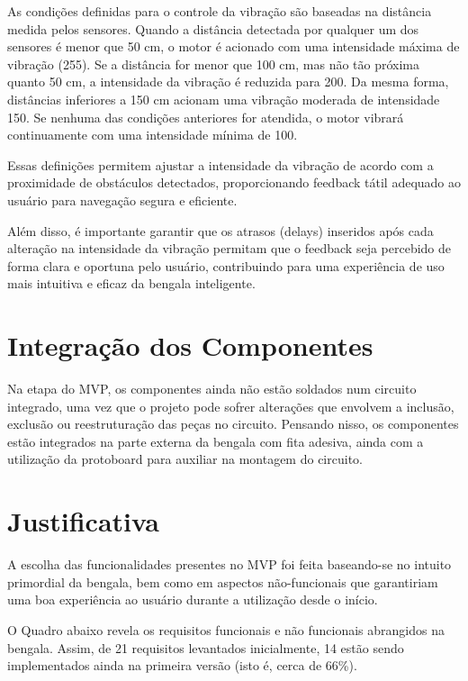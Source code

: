 As condições definidas para o controle da vibração são baseadas na distância medida pelos sensores. Quando a distância detectada por qualquer um dos sensores é menor que 50 cm, o motor é acionado com uma intensidade máxima de vibração (255). Se a distância for menor que 100 cm, mas não tão próxima quanto 50 cm, a intensidade da vibração é reduzida para 200. Da mesma forma, distâncias inferiores a 150 cm acionam uma vibração moderada de intensidade 150. Se nenhuma das condições anteriores for atendida, o motor vibrará continuamente com uma intensidade mínima de 100.

Essas definições permitem ajustar a intensidade da vibração de acordo com a proximidade de obstáculos detectados, proporcionando feedback tátil adequado ao usuário para navegação segura e eficiente.

Além disso, é importante garantir que os atrasos (delays) inseridos após cada alteração na intensidade da vibração permitam que o feedback seja percebido de forma clara e oportuna pelo usuário, contribuindo para uma experiência de uso mais intuitiva e eficaz da bengala inteligente.


\section{Integração dos Componentes}
Na etapa do MVP, os componentes ainda não estão soldados num circuito integrado, uma vez que o projeto pode sofrer alterações que envolvem a inclusão, exclusão ou reestruturação das peças no circuito. Pensando nisso, os componentes estão integrados na parte externa da bengala com fita adesiva, ainda com a utilização da protoboard para auxiliar na montagem do circuito.

\section{Justificativa}
A escolha das funcionalidades presentes no MVP foi feita baseando-se no intuito primordial da bengala, bem como em aspectos não-funcionais que garantiriam uma boa experiência ao usuário durante a utilização desde o início.

 O Quadro abaixo revela os requisitos funcionais e não funcionais abrangidos na bengala. Assim, de 21 requisitos levantados inicialmente, 14 estão sendo implementados ainda na primeira versão (isto é, cerca de 66\%).
 
